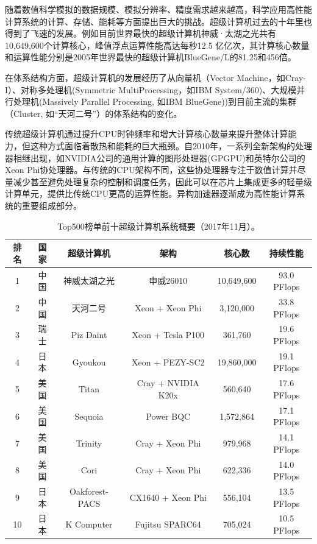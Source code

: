 \documentclass[degree=doctor]{thuthesis}
\begin{document}
随着数值科学模拟的数据规模、模拟分辨率、精度需求越来越高，科学应用高性能计算系统的计算、存储、能耗等方面提出巨大的挑战。超级计算机过去的十年里也得到了飞速的发展。例如目前世界最快的超级计算机神威·太湖之光共有10,649,600个计算核心，峰值浮点运算性能高达每秒12.5 亿亿次，其计算核心数量和运算性能分别是2005年世界最快的超级计算机BlueGene/L的81.25和456倍\cite{top5002015}。

在体系结构方面，超级计算机的发展经历了从向量机（Vector Machine，如Cray-I\cite{russell1978cray}）、对称多处理机(Symmetric MultiProcessing，如IBM System/360\cite{anderson1967ibm})、大规模并行处理机(Massively Parallel Processing, 如IBM BlueGene\cite{adiga2002overview}))到目前主流的集群（Cluster, 如“天河二号”\cite{tianhe-2}）的体系结构的变化。

传统超级计算机通过提升CPU时钟频率和增大计算核心数量来提升整体计算能力，但这种方式面临着散热和能耗的巨大瓶颈。自2010年，一系列全新架构的处理器相继出现，如NVIDIA公司的通用计算的图形处理器\cite{nvidia2008programming}(GPGPU)和英特尔公司的Xeon Phi协处理器\cite{jeffers2013intel}。与传统的CPU架构不同，这些协处理器专注于数值计算并尽量减少甚至避免处理复杂的控制和调度任务，因此可以在芯片上集成更多的轻量级计算单元，提供比传统CPU更高的运算性能。异构加速器逐渐成为高性能计算系统的重要组成部分。

\begin{table}[ht]
\centering
\caption{Top500榜单前十超级计算机系统概要（2017年11月）。}
\label{tb:top500}
\begin{tabular}{cccccc}
\hline\hline
排名 & 国家 & 超级计算机     & 架构               & 核心数      & 持续性能        \\ \hline\hline
1  & 中国 & 神威太湖之光     & 申威26010          & 10,649,600 & 93.0 PFlops \\ \hline
2  & 中国 & 天河二号        & Xeon + Xeon Phi    & 3,120,000  & 33.8 PFlops \\ \hline
3  & 瑞士 & Piz Daint      & Xeon + Tesla P100  & 361,760    & 19.6 PFlops \\ \hline
4  & 日本 & Gyoukou        & Xeon + PEZY-SC2    & 19,860,000 & 19.1 PFlops \\ \hline
5  & 美国 & Titan          & Cray + NVIDIA K20x & 560,640    & 17.6 PFlops \\ \hline
6  & 美国 & Sequoia        & Power BQC          & 1,572,864  & 17.1 PFlops \\ \hline
7  & 美国 & Trinity        & Cray + Xeon Phi    & 979,968    & 14.1 PFlops \\ \hline
8  & 美国 & Cori           & Cray + Xeon Phi    & 622,336    & 14.0 PFlops \\ \hline
9  & 日本 & Oakforest-PACS & CX1640 + Xeon Phi  & 556,104    & 13.5 PFlops \\ \hline
10 & 日本 & K Computer     & Fujitsu SPARC64     & 705,024    & 10.5 PFlops \\ \hline
\end{tabular}
\end{table}
\end{document}
